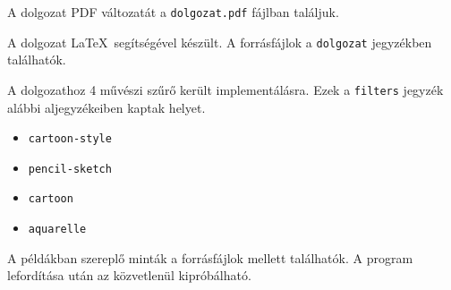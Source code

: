 

A dolgozat PDF változatát a \texttt{dolgozat.pdf} fájlban találjuk.

A dolgozat \LaTeX\ segítségével készült. A forrásfájlok a \texttt{dolgozat} jegyzékben találhatók.

A dolgozathoz 4 művészi szűrő került implementálásra. Ezek a \texttt{filters} jegyzék alábbi aljegyzékeiben kaptak helyet.
\begin{itemize}
\item \texttt{cartoon-style}
\item \texttt{pencil-sketch}
\item \texttt{cartoon}
\item \texttt{aquarelle}
\end{itemize}

A példákban szereplő minták a forrásfájlok mellett találhatók. A program lefordítása után az közvetlenül kipróbálható.
